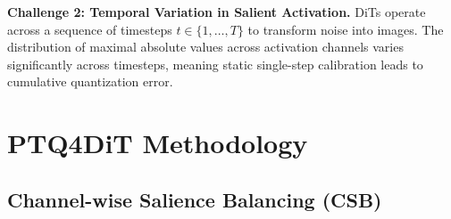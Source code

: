 \documentclass[10pt,a4paper]{article}
\begin{document}
\textbf{Challenge 2: Temporal Variation in Salient Activation.} DiTs operate across a sequence of timesteps $t \in \{1, \ldots, T\}$ to transform noise into images. The distribution of maximal absolute values across activation channels varies significantly across timesteps, meaning static single-step calibration leads to cumulative quantization error.

\section{PTQ4DiT Methodology}

\subsection{Channel-wise Salience Balancing (CSB)}
\end{document}
